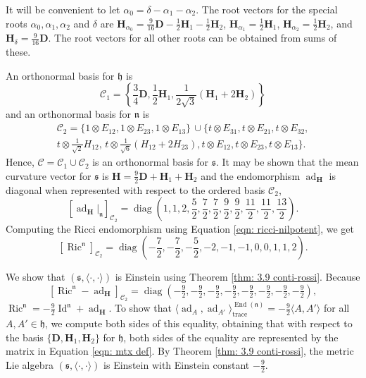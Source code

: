 \documentclass[12pt]{amsart}
\newcommand{\la}{\langle}
\newcommand{\ra}{\rangle}
\newcommand{\smallfrac}[2]{\textstyle{\frac{#1}{#2}}  }
\newcommand{\bfD}{\ensuremath{\mathbf D} }
\newcommand{\bfH}{\ensuremath{\mathbf H} }
\newcommand{\calC}{\ensuremath{\mathcal{C}} }
\newcommand{\trace}{\operatorname{trace}}
\newcommand{\Id}{\operatorname{Id}}
\newcommand{\frakh}{\ensuremath{\mathfrak{h}} }
\newcommand{\frakn}{\ensuremath{\mathfrak{n}} }
\newcommand{\fraks}{\ensuremath{\mathfrak{s}} }
\renewcommand\t{{\mathfrak{t}}}
\newcommand\n{{\mathfrak{n}}}
\newcommand\ip{{\langle\cdot {,} \cdot\rangle}}
\newcommand\diag{\operatorname{diag}}
\newcommand\ad{\operatorname{ad}}
\newcommand\End{\operatorname{End}}
\newcommand{\Ric}{\operatorname{Ric}}
\theoremstyle{plain}
\theoremstyle{definition}
\theoremstyle{remark}
\numberwithin{equation}{section}
\numberwithin{theorem}{section}
\begin{document}
It will be convenient to let  
$\alpha_0 = \delta - \alpha_1 -\alpha_2$.
  The root vectors  for  the special roots $\alpha_0, \alpha_1, \alpha_2$ and $\delta$ are  $\bfH_{\alpha_0} = \tfrac{9}{16}\bfD - \tfrac 12\bfH_1 - \tfrac 12\bfH_2$,  
  $\bfH_{\alpha_1}=\tfrac12 \bfH_1$, $\bfH_{\alpha_2}=\tfrac12 \bfH_2$, and $\bfH_\delta = \tfrac{9}{16}\bfD$.
 The root vectors for all other roots can be obtained from sums of these.

An orthonormal basis for $\frakh$ is
\[  \calC_1 =  \left\{\smallfrac{3}{4} \bfD, \smallfrac{1}{2} \bfH_1, \smallfrac{1}{2\sqrt{3}}(\bfH_1 + 2\bfH_2)
   \right\}\] and  an orthonormal basis for $\n$ is 
\begin{multline*}
\calC_2 = \{ 1\otimes E_{12}, 1\otimes E_{23}, 1\otimes E_{13}\} \, \cup 
          \{  t\otimes E_{31}, t \otimes E_{21}, t \otimes E_{32}, \\t \otimes \tfrac{1}{\sqrt 2} H_{12},\, t \otimes \tfrac{1}{\sqrt{6}}(H_{12}+2H_{23}),  t \otimes E_{12}, t \otimes E_{23}, t \otimes E_{13} \}. 
\end{multline*}  
Hence, $\calC=\calC_1 \cup \calC_2$ is an orthonormal basis for $\fraks.$
It may be shown that the mean curvature vector for $\fraks$ is
$\bfH=\tfrac 92{\bfD} + \bfH_1 + \bfH_2$
and the endomorphism $\ad_{\bfH}$ is diagonal when represented with respect to the ordered basis $\calC_2$, 
\[ [\ad_{\bfH}|_\frakn]_{\calC_2} = \diag\left(1, 1, 2, \smallfrac52, \smallfrac72, \smallfrac72, \frac92, \frac92, \smallfrac{11}{2}, \smallfrac{11}{2}, \smallfrac{13}{2}\right). \]
Computing the Ricci endomorphism  using Equation \eqref{eqn: ricci-nilpotent}, we get
\begin{equation}\label{eqn: Ric n}
[\Ric^\n]_{\calC_2} = \diag\left(-\smallfrac 72, -\smallfrac 72,-\smallfrac 52,-2,-1,-1,0,0,1,1,2\right).
\end{equation}

We show that $(\fraks,\ip)$ is Einstein using Theorem \ref{thm: 3.9 conti-rossi}. Because
\[ [\Ric^\n -\ad_{\bfH}]_{\calC_2} = 
\diag\left(-\tfrac 92, -\tfrac 92,-\tfrac 92,-\tfrac 92, -\tfrac 92,-\tfrac 92,-\tfrac 92,-\tfrac 92  \right),\]
 $\Ric^\frakn = -\smallfrac{9}{2}\Id^\frakn + \ad_{\bfH}$. 
To  show  that 
 $\la \ad_A, \ad_{A'} \ra^{\End(\n)}_{\trace} = -\frac92 \la A, A' \ra$ for all $A, A' \in \frakh$, we compute both sides of this equality, obtaining that  with respect to the basis  $\{ \bfD, \bfH_1, \bfH_2 \}$ for $\frakh$, both sides of the equality are represented by the matrix  in Equation \eqref{eqn: mtx def}.
By Theorem \ref{thm: 3.9 conti-rossi}, the metric Lie algebra $(\fraks,\ip)$ is Einstein with Einstein constant $-\frac92$.  
\end{document}
